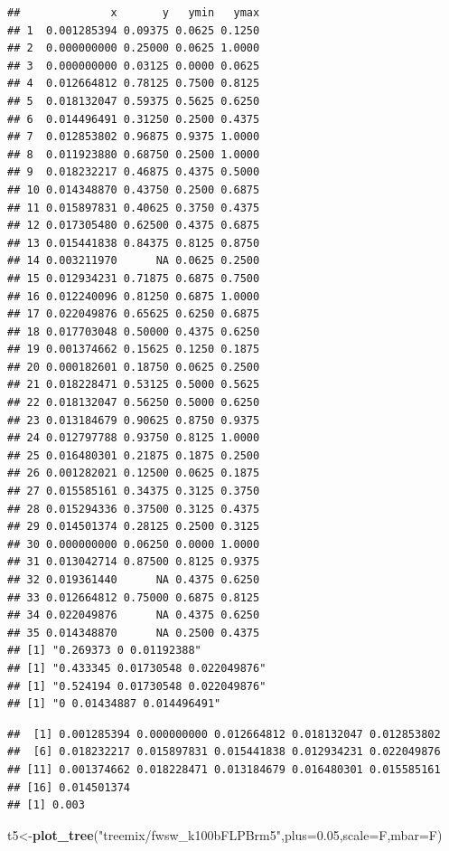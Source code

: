 \documentclass[]{article}
\newenvironment{Shaded}{\begin{snugshade}}{\end{snugshade}}
\newcommand{\KeywordTok}[1]{\textcolor[rgb]{0.13,0.29,0.53}{\textbf{#1}}}
\newcommand{\DataTypeTok}[1]{\textcolor[rgb]{0.13,0.29,0.53}{#1}}
\newcommand{\FloatTok}[1]{\textcolor[rgb]{0.00,0.00,0.81}{#1}}
\newcommand{\StringTok}[1]{\textcolor[rgb]{0.31,0.60,0.02}{#1}}
\newcommand{\NormalTok}[1]{#1}
\begin{document}
\begin{verbatim}
##              x       y   ymin   ymax
## 1  0.001285394 0.09375 0.0625 0.1250
## 2  0.000000000 0.25000 0.0625 1.0000
## 3  0.000000000 0.03125 0.0000 0.0625
## 4  0.012664812 0.78125 0.7500 0.8125
## 5  0.018132047 0.59375 0.5625 0.6250
## 6  0.014496491 0.31250 0.2500 0.4375
## 7  0.012853802 0.96875 0.9375 1.0000
## 8  0.011923880 0.68750 0.2500 1.0000
## 9  0.018232217 0.46875 0.4375 0.5000
## 10 0.014348870 0.43750 0.2500 0.6875
## 11 0.015897831 0.40625 0.3750 0.4375
## 12 0.017305480 0.62500 0.4375 0.6875
## 13 0.015441838 0.84375 0.8125 0.8750
## 14 0.003211970      NA 0.0625 0.2500
## 15 0.012934231 0.71875 0.6875 0.7500
## 16 0.012240096 0.81250 0.6875 1.0000
## 17 0.022049876 0.65625 0.6250 0.6875
## 18 0.017703048 0.50000 0.4375 0.6250
## 19 0.001374662 0.15625 0.1250 0.1875
## 20 0.000182601 0.18750 0.0625 0.2500
## 21 0.018228471 0.53125 0.5000 0.5625
## 22 0.018132047 0.56250 0.5000 0.6250
## 23 0.013184679 0.90625 0.8750 0.9375
## 24 0.012797788 0.93750 0.8125 1.0000
## 25 0.016480301 0.21875 0.1875 0.2500
## 26 0.001282021 0.12500 0.0625 0.1875
## 27 0.015585161 0.34375 0.3125 0.3750
## 28 0.015294336 0.37500 0.3125 0.4375
## 29 0.014501374 0.28125 0.2500 0.3125
## 30 0.000000000 0.06250 0.0000 1.0000
## 31 0.013042714 0.87500 0.8125 0.9375
## 32 0.019361440      NA 0.4375 0.6250
## 33 0.012664812 0.75000 0.6875 0.8125
## 34 0.022049876      NA 0.4375 0.6250
## 35 0.014348870      NA 0.2500 0.4375
## [1] "0.269373 0 0.01192388"
## [1] "0.433345 0.01730548 0.022049876"
## [1] "0.524194 0.01730548 0.022049876"
## [1] "0 0.01434887 0.014496491"
\end{verbatim}

\begin{verbatim}
##  [1] 0.001285394 0.000000000 0.012664812 0.018132047 0.012853802
##  [6] 0.018232217 0.015897831 0.015441838 0.012934231 0.022049876
## [11] 0.001374662 0.018228471 0.013184679 0.016480301 0.015585161
## [16] 0.014501374
## [1] 0.003
\end{verbatim}

\begin{Shaded}
\begin{Highlighting}[]
\NormalTok{t5<-}\KeywordTok{plot_tree}\NormalTok{(}\StringTok{"treemix/fwsw_k100bFLPBrm5"}\NormalTok{,}\DataTypeTok{plus=}\FloatTok{0.05}\NormalTok{,}\DataTypeTok{scale=}\NormalTok{F,}\DataTypeTok{mbar=}\NormalTok{F)}
\end{Highlighting}
\end{Shaded}
\end{document}
